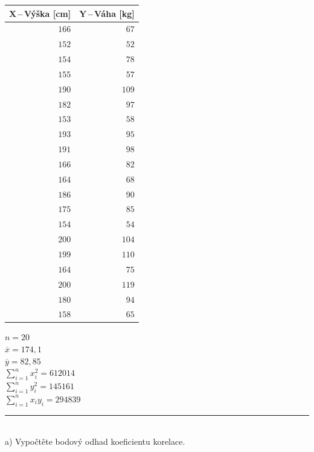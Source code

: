 \documentclass[pdftex, 11pt, a4paper, titlepage]{article}
\begin{document}
    \begin{table}[H]
		\begin{tabular}{|r|r|}
			\multicolumn{1}{c}{\textbf{$ \boldsymbol{X} $\,--\,Výška [cm]}}
			& \multicolumn{1}{c}{\textbf{$ \boldsymbol{Y} $\,--\,Váha [kg]}}
			\\ \hline

			$ 166 $ & $ 67 $ \\ \hline
			$ 152 $ & $ 52 $ \\ \hline
			$ 154 $ & $ 78 $ \\ \hline
			$ 155 $ & $ 57 $ \\ \hline
			$ 190 $ & $ 109 $ \\ \hline
			$ 182 $ & $ 97 $ \\ \hline
			$ 153 $ & $ 58 $ \\ \hline
			$ 193 $ & $ 95 $ \\ \hline
			$ 191 $ & $ 98 $ \\ \hline
			$ 166 $ & $ 82 $ \\ \hline
			$ 164 $ & $ 68 $ \\ \hline
			$ 186 $ & $ 90 $ \\ \hline
			$ 175 $ & $ 85 $ \\ \hline
			$ 154 $ & $ 54 $ \\ \hline
			$ 200 $ & $ 104 $ \\ \hline
			$ 199 $ & $ 110 $ \\ \hline
			$ 164 $ & $ 75 $ \\ \hline
			$ 200 $ & $ 119 $ \\ \hline
			$ 180 $ & $ 94 $ \\ \hline
			$ 158 $ & $ 65 $ \\ \hline
		\end{tabular}
    \end{table}
    
    \noindent
    $n = 20$\\
    $\overline{x} = 174,1$\\
    $\overline{y} = 82,85$\\
    $\sum\limits_{i=1}^{n}x_i^2 = 612014$\\
    $\sum\limits_{i=1}^{n}y_i^2 = 145161$\\
    $\sum\limits_{i=1}^{n}x_iy_i = 294839$\\

    \noindent\rule{\linewidth}{0.4pt}\\

    \noindent
    a) Vypočtěte bodový odhad koeficientu korelace.\\
    
\end{document}
